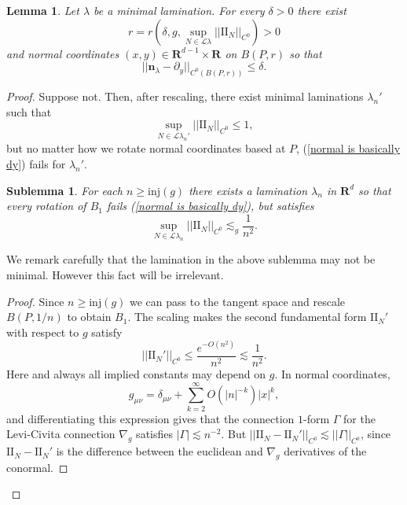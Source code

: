 \documentclass[reqno,11pt]{amsart}
\newcommand{\RR}{\mathbf{R}}
\newcommand{\Leaves}{\mathscr L}
\newcommand{\Two}{\mathrm{I\!I}}
\newcommand{\normal}{\mathbf n}
\newcommand{\inj}{\mathrm{inj}}
\newtheorem{lemma}[theorem]{Lemma}
\newtheorem{sublemma}[theorem]{Sublemma}
\theoremstyle{definition}
\numberwithin{equation}{section}
\begin{document}
\begin{lemma}\label{lams have C0 fields}
	Let $\lambda$ be a minimal lamination.
	For every $\delta > 0$ there exist
\begin{equation}\label{dependency of r}
	r = r\left(\delta, g, \sup_{N \in \Leaves \lambda} ||\Two_N||_{C^0}\right) > 0
\end{equation}
	and normal coordinates $(x, y) \in \RR^{d - 1} \times \RR$ on $B(P, r)$ so that
\begin{equation}\label{normal is basically dy}
	||\normal_\lambda - \partial_y||_{C^0(B(P, r))} \leq \delta.
\end{equation}
\end{lemma}
\begin{proof}
	Suppose not.
	Then, after rescaling, there exist minimal laminations $\lambda_n'$ such that
	$$\sup_{N \in \Leaves \lambda_n'} ||\Two_N||_{C^0} \leq 1,$$
	but no matter how we rotate normal coordinates based at $P$, (\ref{normal is basically dy}) fails for $\lambda_n'$.

\begin{sublemma}
	For each $n \geq \inj(g)$ there exists a lamination $\lambda_n$ in $\RR^d$ so that every rotation of $B_1$ fails (\ref{normal is basically dy}), but satisfies
\begin{equation}\label{bounds on Two in representation}
	\sup_{N \in \Leaves \lambda_n} ||\Two_N||_{C^0} \lesssim_g \frac{1}{n^2}.
\end{equation}
\end{sublemma}

We remark carefully that the lamination in the above sublemma may not be minimal.
However this fact will be irrelevant.

\begin{proof}
	Since $n \geq \inj(g)$ we can pass to the tangent space and rescale $B(P, 1/n)$ to obtain $B_1$. The scaling makes the second fundamental form $\Two_N'$ with respect to $g$ satisfy
$$||\Two_N'||_{C^0} \leq \frac{e^{-O(n^2)}}{n^2} \lesssim \frac{1}{n^2}.$$
	Here and always all implied constants may depend on $g$.
	In normal coordinates,
	$$g_{\mu \nu} = \delta_{\mu \nu} + \sum_{k=2}^\infty O(|n|^{-k}) |x|^k,$$
	and differentiating this expression gives that the connection $1$-form $\Gamma$ for the Levi-Civita connection $\nabla_g$ satisfies $|\Gamma| \lesssim n^{-2}$.
	But $||\Two_N - \Two_N'||_{C^0} \lesssim ||\Gamma||_{C^0}$, since $\Two_N - \Two_N'$ is the difference between the euclidean and $\nabla_g$ derivatives of the conormal.
\end{proof}


\end{proof}
\end{document}
